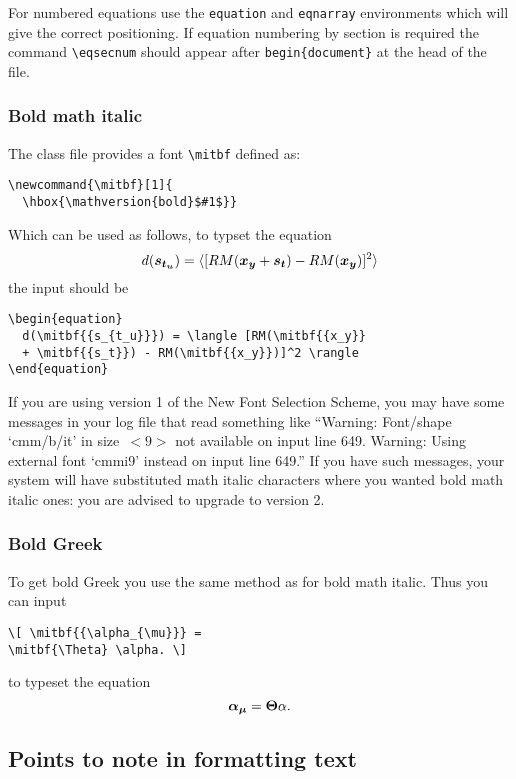 \documentclass{gji}
\begin{document}
For numbered equations use the \verb"equation" and \verb"eqnarray"
environments which will give the correct positioning.
If equation numbering by section is required the command
\verb"\eqsecnum" should appear after \verb"begin{document}"
at the head of the file.

\subsubsection{Bold math italic}\label{boldmathitalic}

The class file provides a font \verb"\mitbf" defined as:
\begin{verbatim}
\newcommand{\mitbf}[1]{
  \hbox{\mathversion{bold}$#1$}}
\end{verbatim}
Which can be used as follows, to typset the equation
\begin{equation}
  d(\mitbf{{s_{t_u}}}) = \langle [RM(\mitbf{{x_y}}
  + \mitbf{{s_t}}) - RM(\mitbf{{x_y}})]^2 \rangle
\end{equation}
the input should be
\begin{verbatim}
\begin{equation}
  d(\mitbf{{s_{t_u}}}) = \langle [RM(\mitbf{{x_y}}
  + \mitbf{{s_t}}) - RM(\mitbf{{x_y}})]^2 \rangle
\end{equation}
\end{verbatim}

If you are using version 1 of the New Font Selection Scheme, you may
have some messages in your log file that read something like ``Warning:
Font/shape `cmm/b/it' in size~\hbox{$< \!\! 9 \!\! >$} not available
on input line 649. Warning: Using external font `cmmi9' instead on input
line 649.'' If you have such messages, your system will have substituted
math italic characters where you wanted bold math italic ones: you
are advised to upgrade to version 2.


\subsubsection{Bold Greek}\label{boldgreek}

To get bold Greek you use the same
method as for bold math italic. Thus you can input
\begin{verbatim}
\[ \mitbf{{\alpha_{\mu}}} =
\mitbf{\Theta} \alpha. \]
\end{verbatim}
to typeset the equation
\[ \mitbf{{\alpha_{\mu}}} = \mitbf{\Theta} \alpha . \]


\subsection{Points to note in formatting text}\label{formtext}
\end{document}
